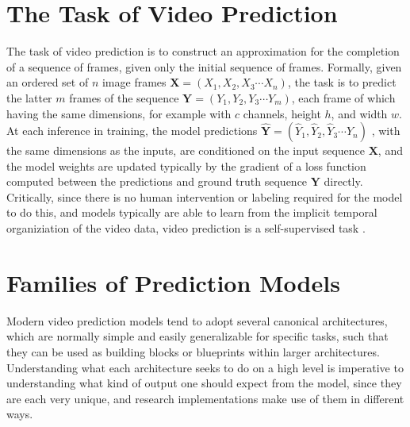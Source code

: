 \documentclass{scrartcl}
\begin{document}
\section{The Task of Video Prediction}
\label{sec:task}

\newcommand{\Xseq}{$\boldsymbol{X} = \left( X_1 , X_2 , X_3 \cdots X_n \right)$}
\newcommand{\Yseq}{$\boldsymbol{Y} = \left( Y_1 , Y_2 , Y_3 \cdots Y_m \right)$}
\newcommand{\Yhatseq}{
	$\hat{\boldsymbol{Y}} = 
	\left( \hat{Y}_1 , \hat{Y}_2 , \hat{Y}_3 \cdots \hat{Y}_n \right)$
}

The task of video prediction is to construct an approximation for the
completion of a sequence of frames, given only the initial sequence of frames.
Formally, given an ordered set of $n$ image frames \Xseq, the task is to
predict the latter $m$ frames of the sequence \Yseq, each frame of which having
the same dimensions, for example with $c$ channels, height $h$, and width $w$.
At each inference in training, the model predictions \Yhatseq, with the same
dimensions as the inputs, are conditioned on the input sequence
$\boldsymbol{X}$, and the model weights are updated typically by the gradient
of a loss function computed between the predictions and ground truth sequence
$\boldsymbol{Y}$ directly. Critically, since there is no human intervention or
labeling required for the model to do this, and models typically are able to
learn from the implicit temporal organiziation of the video data, video
prediction is a self-supervised task \cite{video_prediction_survey}.


\newpage
\section{Families of Prediction Models}
\label{sec:families}

Modern video prediction models tend to adopt several canonical architectures,
which are normally simple and easily generalizable for specific tasks, such
that they can be used as building blocks or blueprints within larger
architectures. Understanding what each architecture seeks to do on a high level
is imperative to understanding what kind of output one should expect from the
model, since they are each very unique, and research implementations make use
of them in different ways.
\end{document}
